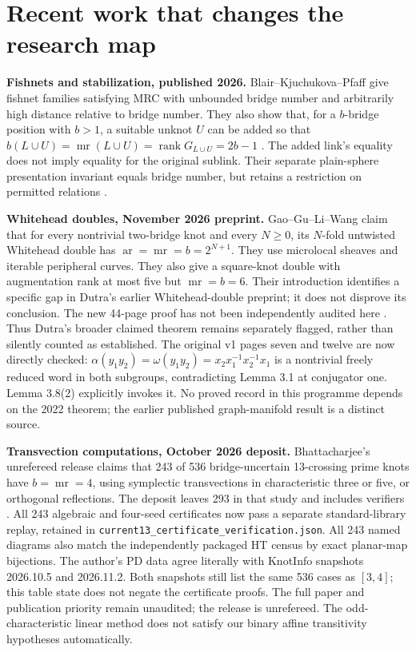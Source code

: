 \documentclass[11pt]{article}
\newcommand{\mr}{\operatorname{mr}}
\begin{document}
\section{Recent work that changes the research map}

\textbf{Fishnets and stabilization, published 2026.}
Blair--Kjuchukova--Pfaff give fishnet families satisfying MRC with
unbounded bridge number and arbitrarily high distance relative to bridge
number. They also show that, for a $b$-bridge position with $b>1$, a
suitable unknot $U$ can be added so that
$b(L\cup U)=\mr(L\cup U)=\operatorname{rank}G_{L\cup U}=2b-1$
\cite{fishnet}. The added link's equality does not imply equality for the
original sublink. Their separate plain-sphere presentation invariant equals
bridge number, but retains a restriction on permitted relations \cite{plain}.

\textbf{Whitehead doubles, November 2026 preprint.}
Gao--Gu--Li--Wang claim that for every nontrivial two-bridge knot and every
$N\ge0$, its $N$-fold untwisted Whitehead double has
$\operatorname{ar}=\mr=b=2^{N+1}$. They use microlocal sheaves and iterable
peripheral curves. They also give a square-knot double with augmentation
rank at most five but $\mr=b=6$. Their introduction identifies a specific
gap in Dutra's earlier Whitehead-double preprint; it does not disprove
its conclusion. The new 44-page proof has not been independently audited
here \cite{whitehead}. Thus Dutra's broader claimed theorem remains
separately flagged, rather than silently counted as established.
The original v1 pages seven and twelve are now directly checked:
$\alpha(y_1y_2)=\omega(y_1y_2)=x_2x_1^{-1}x_2^{-1}x_1$ is a
nontrivial freely reduced word in both subgroups, contradicting
Lemma 3.1 at conjugator one. Lemma 3.8(2) explicitly invokes it.
No proved record in this programme depends on the 2022 theorem;
the earlier published graph-manifold result is a distinct source.

\textbf{Transvection computations, October 2026 deposit.}
Bhattacharjee's unrefereed release claims that 243 of 536 bridge-uncertain
13-crossing prime knots have $b=\mr=4$, using symplectic transvections in
characteristic three or five, or orthogonal reflections. The deposit
leaves 293 in that study and includes verifiers \cite{deposit}. All 243
algebraic and four-seed certificates now pass a separate standard-library
replay, retained in \texttt{current13\_certificate\_verification.json}.
All 243 named diagrams also match the independently packaged HT census
by exact planar-map bijections. The author's PD data agree literally
with KnotInfo snapshots 2026.10.5 and 2026.11.2. Both snapshots still list
the same 536 cases as $[3,4]$; this table state does not negate the
certificate proofs. The full paper and publication priority remain
unaudited; the release is unrefereed.
The odd-characteristic linear method
does not satisfy our binary affine transitivity hypotheses automatically.
\end{document}
